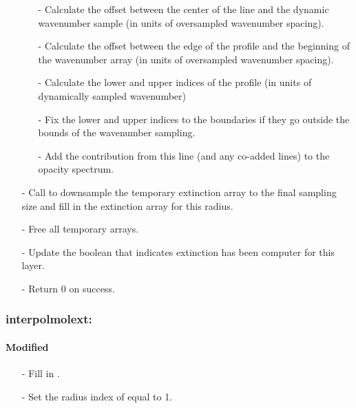 \documentclass[letterpaper,12pt]{article}
\begin{document}
\begin{enumerate}[leftmargin=10pt, noitemsep, parsep=0pt, topsep=0ex]
\begin{enumerate}[leftmargin=10pt, noitemsep, parsep=0pt, topsep=0ex]
\item[-] Calculate the offset between the center of the line and the dynamic wavenumber sample (in units of oversampled wavenumber spacing).
\item[-] Calculate the offset between the edge of the profile and the beginning of the wavenumber array (in units of oversampled wavenumber spacing).
\item[-] Calculate the lower and upper indices of the profile (in units of dynamically sampled wavenumber)
\item[-] Fix the lower and upper indices to the boundaries if they go outside the bounds of the wavenumber sampling.
\item[-] Add the contribution from this line (and any co-added lines) to the opacity spectrum.
\end{enumerate}
\item[-] Call  to downsample the temporary extinction array to the final sampling size and fill in the extinction array for this radius.
\item[-] Free all temporary arrays.
\item[-] Update the boolean that indicates extinction has been computer for this layer.
\item[-] Return 0 on success.
\end{enumerate}


\subsubsection{interpolmolext:}
\paragraph{Modified}
\begin{enumerate}[leftmargin=10pt, noitemsep, parsep=0pt, topsep=0ex]
\item[-] Fill in . 
\item[-] Set the radius index of  equal to 1.
\end{enumerate}
\end{document}
